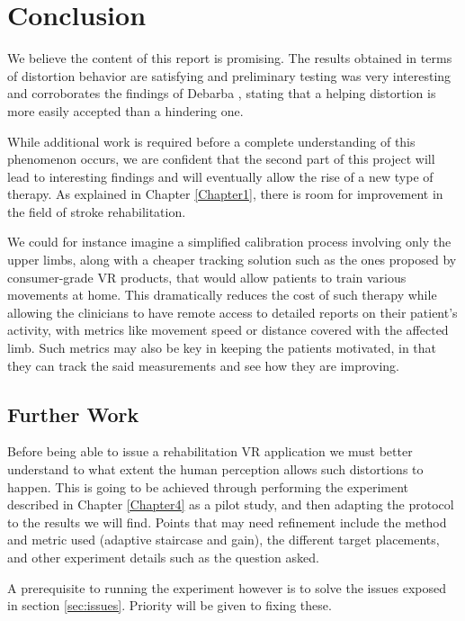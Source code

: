 
\chapter{Conclusion} %

\label{Chapter6}

We believe the content of this report is promising. The results obtained in terms of distortion behavior are satisfying and preliminary testing was very interesting and corroborates the findings of Debarba \cite{debarba2017embodiment}, stating that a helping distortion is more easily accepted than a hindering one.

While additional work is required before a complete understanding of this phenomenon occurs, we are confident that the second part of this project will lead to interesting findings and will eventually allow the rise of a new type of therapy. As explained in Chapter \ref{Chapter1}, there is room for improvement in the field of stroke rehabilitation.

We could for instance imagine a simplified calibration process involving only the upper limbs, along with a cheaper tracking solution such as the ones proposed by consumer-grade VR products, that would allow patients to train various movements at home. This dramatically reduces the cost of such therapy while allowing the clinicians to have remote access to detailed reports on their patient's activity, with metrics like movement speed or distance covered with the affected limb. Such metrics may also be key in keeping the patients motivated, in that they can track the said measurements and see how they are improving.

\section{Further Work}

Before being able to issue a rehabilitation VR application we must better understand to what extent the human perception allows such distortions to happen. This is going to be achieved through performing the experiment described in Chapter \ref{Chapter4} as a pilot study, and then adapting the protocol to the results we will find. Points that may need refinement include the method and metric used (adaptive staircase and gain), the different target placements, and other experiment details such as the question asked.

A prerequisite to running the experiment however is to solve the issues exposed in section \ref{sec:issues}. Priority will be given to fixing these.

